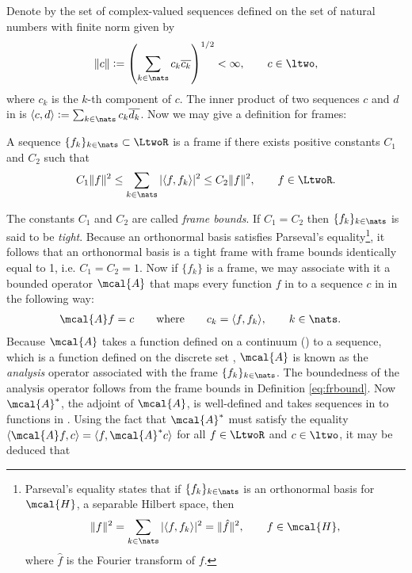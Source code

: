 \documentclass[a4paper, 12pt]{article}
\begin{document}
 Denote by \ltwo the set of  complex-valued sequences defined on the set of natural numbers \nats with finite norm given by 
 \begin{align}
   \Vert c \Vert := \left( \sum_{k \in \nats} c_k \overline{c_k} \right)^{1/2} <   \infty, \qquad c \in \ltwo,\notag
   \label{}
 \end{align}
 where $c_k$ is the $k$-th component of $c$. The inner product of two sequences $c$ and $d$ in \ltwo is $\langle c, d \rangle := \sum_{k \in \nats} c_k \overline{d_k}$. Now we may give a definition for frames:
\begin{defn}\label{eq:frbound}
   A sequence $\{f_k\}_{k \in \nats} \subset \LtwoR$ is a frame if there exists positive constants $C_1$ and $C_2$ such that
  \begin{align}
    C_1\Vert f \Vert^2 \le \sum_{k \in \nats}\vert \langle f, f_k\rangle \vert^2 \le  C_2 \Vert f \Vert^2,
  \qquad   f \in \LtwoR. \notag 
  \end{align}
\end{defn}
\noindent The  constants $C_1$ and $C_2$ are called   \emph{frame bounds}. If $C_1 = C_2$ then $\{f_k \}_{k \in \nats}$ is said to be \emph{tight}. Because an  orthonormal basis satisfies  Parseval's equality\footnote{
  Parseval's equality states that if $\{f_k\}_{k \in \nats}$ is an orthonormal basis for $\mcal{H}$, a separable Hilbert space, then
  \begin{align}
    \Vert f \Vert^2 = \sum_{k \in \nats} \vert \langle f, f_k \rangle \vert^2 =\Vert \hat{f} \Vert^2, \qquad  f \in \mcal{H},  \notag
    \label{}
  \end{align}
  where $\hat{f}$ is the Fourier transform of $f$.
}, it follows that an orthonormal basis is a tight frame with frame bounds identically equal to 1, i.e. $C_1 = C_2 = 1$.  Now if $\{f_k\}$ is a frame, we may associate with it a bounded operator $\mcal{A}$ that maps every function  $f$ in  \LtwoR to a sequence $c$ in \ltwo in the following way:
\begin{align}
  &\mcal{A} f  = c \qquad \text{where} \qquad c_k = \langle f, f_k\rangle, \qquad  k \in \nats. 
  \label{eq:analysis}
\end{align}
Because $\mcal{A}$ takes a function defined on a continuum (\real) to a sequence, which is a function defined on the discrete set \nats, $\mcal{A}$ is known as the \emph{analysis} operator associated with the frame $\{f_k\}_{k \in \nats}$. The boundedness of the analysis operator follows from the frame bounds in  Definition \eqref{eq:frbound}. Now $\mcal{A}^*$, the adjoint   of $\mcal{A}$, is well-defined and takes sequences in \ltwo to functions in \LtwoR.  Using the fact that  $\mcal{A}^*$ must satisfy the equality $\langle \mcal{A} f  , c\rangle = \langle f,\mcal{A}^*c\rangle$ for all $f \in \LtwoR$ and $c \in \ltwo$, it may be deduced that
\end{document}
